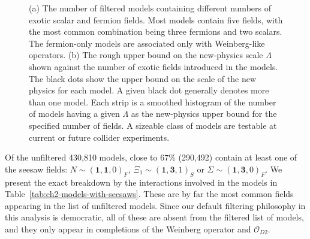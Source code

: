 \begin{figure}
  \centering
  \caption[(a) The number of filtered models containing different numbers of
  exotic scalar and fermion fields. (b) The rough upper bound on the new-physics
  scale $\Lambda$ shown against the number of exotic fields introduced in the
  models.]{(a) The number of filtered models containing different numbers of
    exotic scalar and fermion fields. Most models contain five fields, with the
    most common combination being three fermions and two scalars. The
    fermion-only models are associated only with Weinberg-like operators. (b)
    The rough upper bound on the new-physics scale $\Lambda$ shown against the
    number of exotic fields introduced in the models. The black dots show the
    upper bound on the scale of the new physics for each model. A given black
    dot generally denotes more than one model. Each strip is a smoothed
    histogram of the number of models having a given $\Lambda$ as the
    new-physics upper bound for the specified number of fields. A sizeable class
    of models are testable at current or future collider experiments.}
  \label{fig:ch2-number-of-fields}
\end{figure}

Of the unfiltered 430,810 models, close to $67\%$ (290,492) contain at least one
of the seesaw fields: $N \sim (\mathbf{1}, \mathbf{1}, 0)_{F}$,
$\Xi_{1} \sim (\mathbf{1}, \mathbf{3}, 1)_{S}$ or
$\Sigma \sim (\mathbf{1}, \mathbf{3}, 0)_{F}$. We present the exact breakdown by
the interactions involved in the models in Table~\ref{tab:ch2-models-with-seesaws}.
These are by far the most common fields appearing in the list of unfiltered
models. Since our default filtering philosophy in this analysis is democratic,
all of these are absent from the filtered list of models, and they only appear
in completions of the Weinberg operator and $\mathcal{O}_{D2}$.

